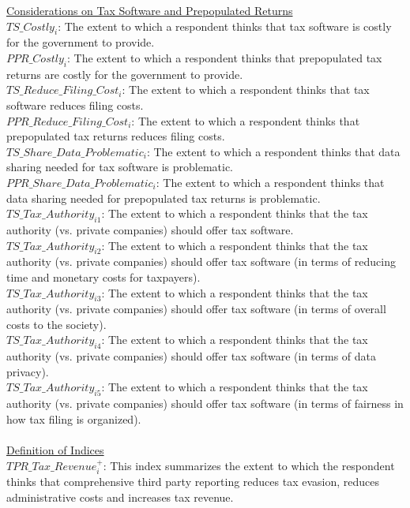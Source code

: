 \documentclass[11pt]{article}
\begin{document}
\underline{Considerations on Tax Software and Prepopulated Returns} \\[0.15em]
$TS\_Costly_i$: The extent to which a respondent thinks that tax software is costly for the government to provide.\\[0.15em]
$PPR\_Costly_i$: The extent to which a respondent thinks that prepopulated tax returns are costly for the government to provide. \\[0.15em]
$TS\_Reduce\_Filing\_Cost_i$: The extent to which a respondent thinks that tax software reduces filing costs.\\[0.15em]
$PPR\_Reduce\_Filing\_Cost_i$: The extent to which a respondent thinks that prepopulated tax returns reduces filing costs.\\
$TS\_Share\_Data\_Problematic_i$: The extent to which a respondent thinks that data sharing needed for tax software is problematic.\\[0.15em]
$PPR\_Share\_Data\_Problematic_i$: The extent to which a respondent thinks that data sharing needed for prepopulated tax returns is problematic. \\[0.15em]
$TS\_Tax\_Authority_{i1}$: The extent to which a respondent thinks that the tax authority (vs. private companies) should offer tax software. \\[0.15em]
$TS\_Tax\_Authority_{i2}$: The extent to which a respondent thinks that the tax authority (vs. private companies) should offer tax software (in terms of reducing time and monetary costs for taxpayers). \\[0.15em]
$TS\_Tax\_Authority_{i3}$: The extent to which a respondent thinks that the tax authority (vs. private companies) should offer tax software (in terms of overall costs to the society).\\[0.15em]
$TS\_Tax\_Authority_{i4}$: The extent to which a respondent thinks that the tax authority (vs. private companies) should offer tax software (in terms of data privacy).\\[0.15em]
$TS\_Tax\_Authority_{i5}$: The extent to which a respondent thinks that the tax authority (vs. private companies) should offer tax software (in terms of fairness in how tax filing is organized).\\[0.15em]
\\[0.15em]
\underline{Definition of Indices} \\[0.15em]
$TPR\_Tax\_Revenue_i^+$: This index summarizes the extent to which the respondent thinks that comprehensive third party reporting reduces tax evasion, reduces administrative costs and increases tax revenue.  \\[0.15em]
\end{document}
